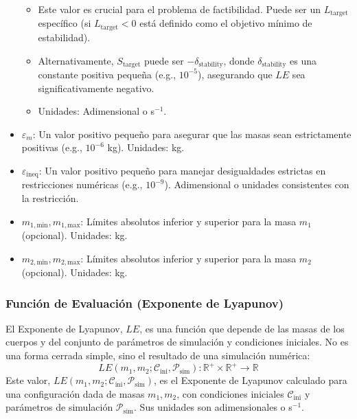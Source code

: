 \begin{itemize}
    \begin{itemize}
        \item Este valor es crucial para el problema de factibilidad. Puede ser un $L_{\text{target}}$ específico (si $L_{\text{target}} < 0$ está definido como el objetivo mínimo de estabilidad).
        \item Alternativamente, $S_{\text{target}}$ puede ser $-\delta_{\text{stability}}$, donde $\delta_{\text{stability}}$ es una constante positiva pequeña (e.g., $10^{-5}$), asegurando que $LE$ sea significativamente negativo.
        \item Unidades: Adimensional o s$^{-1}$.
    \end{itemize}
    \item $\varepsilon_m$: Un valor positivo pequeño para asegurar que las masas sean estrictamente positivas (e.g., $10^{-6}$ kg). Unidades: kg.
    \item $\varepsilon_{\text{ineq}}$: Un valor positivo pequeño para manejar desigualdades estrictas en restricciones numéricas (e.g., $10^{-9}$). Adimensional o unidades consistentes con la restricción.
    \item $m_{1,\text{min}}, m_{1,\text{max}}$: Límites absolutos inferior y superior para la masa $m_1$ (opcional). Unidades: kg.
    \item $m_{2,\text{min}}, m_{2,\text{max}}$: Límites absolutos inferior y superior para la masa $m_2$ (opcional). Unidades: kg.
\end{itemize}

\subsubsection{Función de Evaluación (Exponente de Lyapunov)}%
\label{ssubsec:funcion_evaluacion}
El Exponente de Lyapunov, $LE$, es una función que depende de las masas de los cuerpos y del conjunto de parámetros de simulación y condiciones iniciales. No es una forma cerrada simple, sino el resultado de una simulación numérica:
\begin{equation}
LE(m_1, m_2; \mathcal{C}_{\text{ini}}, \mathcal{P}_{\text{sim}}) \colon \mathbb{R}^+ \times \mathbb{R}^+ \to \mathbb{R}
\end{equation}
Este valor, $LE(m_1, m_2; \mathcal{C}_{\text{ini}}, \mathcal{P}_{\text{sim}})$, es el Exponente de Lyapunov calculado para una configuración dada de masas $m_1, m_2$, con condiciones iniciales $\mathcal{C}_{\text{ini}}$ y parámetros de simulación $\mathcal{P}_{\text{sim}}$. Sus unidades son adimensionales o s$^{-1}$.
